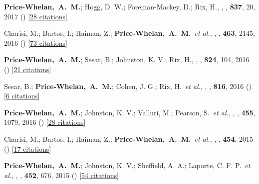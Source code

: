 \item[{\color{deemph}\scriptsize24}]\textbf{Price-Whelan,~A.~M.}; Hogg, D. W.; Foreman-Mackey, D.; Rix, H., , \apj, \textbf{837}, 20, 2017 () [\href{http://adsabs.harvard.edu/abs/2017ApJ...837...20P}{28 citations}]

\item[{\color{deemph}\scriptsize23}]Charisi, M.; Bartos, I.; Haiman, Z.; \textbf{Price-Whelan,~A.~M.}~\textit{et al.}, , \mnras, \textbf{463}, 2145, 2016 () [\href{http://adsabs.harvard.edu/abs/2016MNRAS.463.2145C}{73 citations}]

\item[{\color{deemph}\scriptsize22}]\textbf{Price-Whelan,~A.~M.}; Sesar, B.; Johnston, K. V.; Rix, H., , \apj, \textbf{824}, 104, 2016 () [\href{http://adsabs.harvard.edu/abs/2016ApJ...824..104P}{21 citations}]

\item[{\color{deemph}\scriptsize21}]Sesar, B.; \textbf{Price-Whelan,~A.~M.}; Cohen, J. G.; Rix, H.~\textit{et al.}, , \apj, \textbf{816}, 2016 () [\href{http://adsabs.harvard.edu/abs/2016ApJ...816L...4S}{6 citations}]

\item[{\color{deemph}\scriptsize20}]\textbf{Price-Whelan,~A.~M.}; Johnston, K. V.; Valluri, M.; Pearson, S.~\textit{et al.}, , \mnras, \textbf{455}, 1079, 2016 () [\href{http://adsabs.harvard.edu/abs/2016MNRAS.455.1079P}{28 citations}]

\item[{\color{deemph}\scriptsize19}]Charisi, M.; Bartos, I.; Haiman, Z.; \textbf{Price-Whelan,~A.~M.}~\textit{et al.}, , \mnras, \textbf{454}, 2015 () [\href{http://adsabs.harvard.edu/abs/2015MNRAS.454L..21C}{17 citations}]

\item[{\color{deemph}\scriptsize18}]\textbf{Price-Whelan,~A.~M.}; Johnston, K. V.; Sheffield, A. A.; Laporte, C. F. P.~\textit{et al.}, , \mnras, \textbf{452}, 676, 2015 () [\href{http://adsabs.harvard.edu/abs/2015MNRAS.452..676P}{54 citations}]

